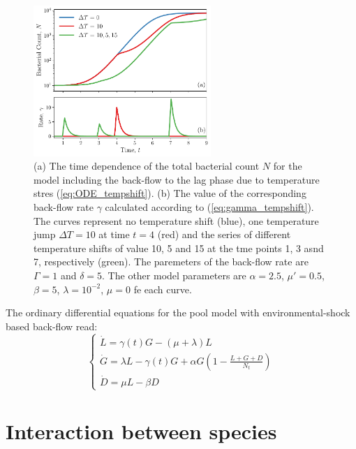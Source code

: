 \documentclass[10pt,A4paper]{article}
\begin{document}
\begin{figure}[t]
    \begin{center}
    \includegraphics[width=0.6\textwidth]{Figures/pool_model_3pools_resource_tempshift.pdf}
    \caption{{\footnotesize (a) The time dependence of the total bacterial count $N$ for the model including the back-flow to the lag phase due to temperature stres (\ref{eq:ODE_tempshift}).
    (b) The value of the corresponding back-flow rate $\gamma$ calculated according to (\ref{eq:gamma_tempshift}).
    The curves represent no temperature shift (blue), one temperature jump $\Delta T = 10$ at time $t=4$ (red) 
    and the series of different temperature shifts of value 10, 5 and 15 at the tme points 1, 3 asnd 7, respectively (green).
    The paremeters of the back-flow rate are $\Gamma=1$ and $\delta=5$.
    The other model parameters are $\alpha=2.5$, $\mu'=0.5$, $\beta=5$, $\lambda=10^{-2}$, $\mu = 0$ fe each curve.
    }}
    \label{fig:TempJump}
    \end{center}
\end{figure}

The ordinary differential equations for the pool model with environmental-shock based back-flow read:
\begin{equation}
    \begin{cases}
    \dot{L} =\gamma(t) G - (\mu + \lambda) L\\
    \dot{G} = \lambda L -\gamma(t) G + \alpha G\left(1-\frac{L+G+D}{N_t}\right)\\
    \dot{D} = \mu  L - \beta D
    \label{eq:ODE_tempshift}
    \end{cases}
\end{equation}




\newpage

\section{Interaction between species}
\end{document}
